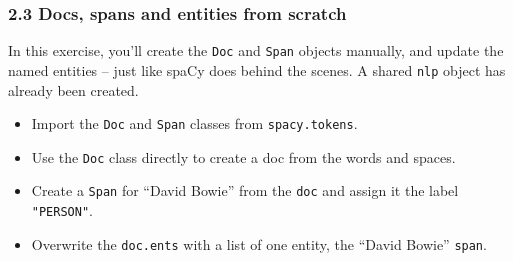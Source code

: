 \documentclass[11pt]{article}
\providecommand{\tightlist}{%
      \setlength{\itemsep}{0pt}\setlength{\parskip}{0pt}}
\begin{document}
    \hypertarget{docs-spans-and-entities-from-scratch}{%
\subsubsection{2.3 Docs, spans and entities from
scratch}\label{docs-spans-and-entities-from-scratch}}

In this exercise, you'll create the \texttt{Doc} and \texttt{Span}
objects manually, and update the named entities -- just like spaCy does
behind the scenes. A shared \texttt{nlp} object has already been
created.

\begin{itemize}
\tightlist
\item
  Import the \texttt{Doc} and \texttt{Span} classes from
  \texttt{spacy.tokens}.
\item
  Use the \texttt{Doc} class directly to create a doc from the words and
  spaces.
\item
  Create a \texttt{Span} for ``David Bowie'' from the \texttt{doc} and
  assign it the label \texttt{"PERSON"}.
\item
  Overwrite the \texttt{doc.ents} with a list of one entity, the ``David
  Bowie'' \texttt{span}.
\end{itemize}
\end{document}
